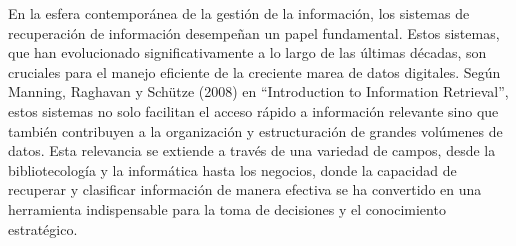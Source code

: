 %
%
%
%

En la esfera contemporánea de la gestión de la información, los sistemas de recuperación de información desempeñan un papel fundamental. Estos sistemas, que han evolucionado significativamente a lo largo de las últimas décadas, son cruciales para el manejo eficiente de la creciente marea de datos digitales. Según Manning, Raghavan y Schütze (2008) en ``Introduction to Information Retrieval'', estos sistemas no solo facilitan el acceso rápido a información relevante sino que también contribuyen a la organización y estructuración de grandes volúmenes de datos. Esta relevancia se extiende a través de una variedad de campos, desde la bibliotecología y la informática hasta los negocios, donde la capacidad de recuperar y clasificar información de manera efectiva se ha convertido en una herramienta indispensable para la toma de decisiones y el conocimiento estratégico.

